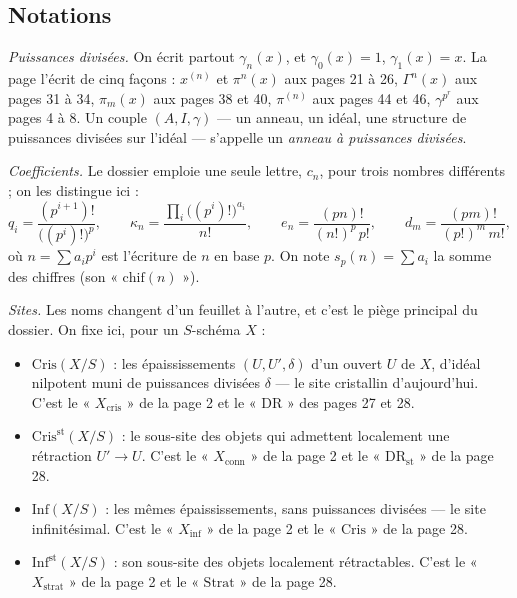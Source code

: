 \documentclass[11pt,a4paper]{article}
\begin{document}
\subsection*{Notations}

\emph{Puissances divisées.} On écrit partout $\gamma_n(x)$, et
$\gamma_0(x) = 1$, $\gamma_1(x) = x$. La page l'écrit de cinq façons :
$x^{(n)}$ et $\pi^{n}(x)$ aux pages 21 à 26, $\Gamma^{n}(x)$ aux pages 31
à 34, $\pi_m(x)$ aux pages 38 et 40, $\pi^{(n)}$ aux pages 44 et 46,
$\gamma^{p^{r}}$ aux pages 4 à 8. Un couple $(A, I, \gamma)$ — un anneau, un
idéal, une structure de puissances divisées sur l'idéal — s'appelle un
\emph{anneau à puissances divisées}.

\emph{Coefficients.} Le dossier emploie une seule lettre, $c_n$, pour trois
nombres différents ; on les distingue ici :
\[
q_i = \frac{(p^{i+1})!}{\bigl((p^{i})!\bigr)^{p}}, \qquad
\kappa_n = \frac{\prod_i \bigl((p^{i})!\bigr)^{a_i}}{n!}, \qquad
e_n = \frac{(pn)!}{(n!)^{p}\, p!}, \qquad
d_m = \frac{(pm)!}{(p!)^{m}\, m!},
\]
où $n = \sum a_i p^{i}$ est l'écriture de $n$ en base $p$. On note
$s_p(n) = \sum a_i$ la somme des chiffres (son « $\mathrm{chif}(n)$ »).

\emph{Sites.} Les noms changent d'un feuillet à l'autre, et c'est le piège
principal du dossier. On fixe ici, pour un $S$-schéma $X$ :

\begin{itemize}
\item $\mathrm{Cris}(X/S)$ : les épaississements $(U, U', \delta)$ d'un
ouvert $U$ de $X$, d'idéal nilpotent muni de puissances divisées $\delta$
— le site cristallin d'aujourd'hui. C'est le « $X_{\mathrm{cris}}$ » de la
page 2 et le « $\mathrm{DR}$ » des pages 27 et 28.
\item $\mathrm{Cris}^{\mathrm{st}}(X/S)$ : le sous-site des objets qui
admettent localement une rétraction $U' \to U$. C'est le
« $X_{\mathrm{conn}}$ » de la page 2 et le « $\mathrm{DR}_{\mathrm{st}}$ »
de la page 28.
\item $\mathrm{Inf}(X/S)$ : les mêmes épaississements, sans puissances
divisées — le site infinitésimal. C'est le « $X_{\mathrm{inf}}$ » de la page
2 et le « $\mathrm{Cris}$ » de la page 28.
\item $\mathrm{Inf}^{\mathrm{st}}(X/S)$ : son sous-site des objets
localement rétractables. C'est le « $X_{\mathrm{strat}}$ » de la page 2 et le
« $\mathrm{Strat}$ » de la page 28.
\end{itemize}
\end{document}
